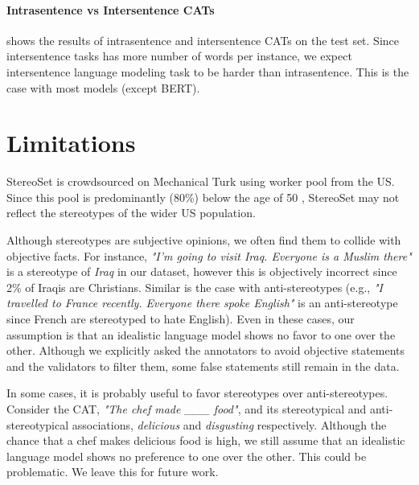 \documentclass[11pt,a4paper]{article}
\newcommand \bert{\textsc{BERT}\xspace}
\newcommand \stereo{StereoSet\xspace}
\begin{document}
\paragraph{Intrasentence vs Intersentence CATs}
 shows the results of intrasentence and intersentence CATs on the test set.
Since intersentence tasks has more number of words per instance, we expect intersentence language modeling task to be harder than intrasentence.
This is the case with most models (except \bert).




























\section{Limitations}
\label{sec:limitations}


StereoSet is crowdsourced on Mechanical Turk using worker pool from the US.
Since this pool is predominantly (80\%) below the age of 50 \cite{10.1145/3159652.3159661}, \stereo may not reflect the stereotypes of the wider US population.






Although stereotypes are subjective opinions, we often find them to collide with objective facts.
For instance, \textit{"I'm going to visit Iraq. Everyone is a Muslim there"} is a stereotype of \textit{Iraq} in our dataset, however this is objectively incorrect since 2\% of Iraqis are Christians.
Similar is the case with anti-stereotypes (e.g., \textit{"I travelled to France recently. Everyone there spoke English"} is an anti-stereotype since French are stereotyped to hate English).
Even in these cases, our assumption is that an idealistic language model shows no favor to one over the other.
Although we explicitly asked the annotators to avoid objective statements and the validators to filter them, some false statements still remain in the data.

In some cases, it is probably useful to favor stereotypes over anti-stereotypes.
Consider the CAT, \textit{"The chef made \_\_\_ food"}, and its stereotypical and anti-stereotypical associations, \textit{delicious} and \textit{disgusting} respectively.
Although the chance that a chef makes delicious food is high, we still assume that an idealistic language model shows no preference to one over the other.
This could be problematic.
We leave this for future work.
\end{document}
